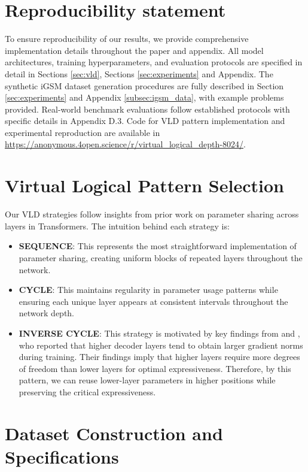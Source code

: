 \documentclass{article} %
\begin{document}
\section{ Reproducibility statement}
To ensure reproducibility of our results, we provide comprehensive implementation details throughout the paper and appendix. All model architectures, training hyperparameters, and evaluation protocols are specified in detail in Sections \ref{sec:vld}, Sections \ref{sec:experiments} and Appendix. The synthetic iGSM dataset generation procedures are fully described in Section \ref{sec:experiments} and Appendix \ref{subsec:igsm_data}, with example problems provided. Real-world benchmark evaluations follow established protocols with specific details in Appendix D.3. Code for VLD pattern implementation and experimental reproduction are available in \url{https://anonymous.4open.science/r/virtual_logical_depth-8024/}. 



\section{Virtual Logical Pattern Selection}
\label{sec:d}
Our VLD strategies follow insights from prior work on parameter sharing across layers in Transformers. The intuition behind each strategy is:

\begin{itemize}
    \item \textbf{SEQUENCE}: This represents the most straightforward implementation of parameter sharing, creating uniform blocks of repeated layers throughout the network.
    \item \textbf{CYCLE}: This maintains regularity in parameter usage patterns while ensuring each unique layer appears at consistent intervals throughout the network depth.
    \item \textbf{INVERSE CYCLE}: This strategy is motivated by key findings from \citep{liu2023enhancing} and \citep{takase2021lessons}, who reported that higher decoder layers tend to obtain larger gradient norms during training. Their findings imply that higher layers require more degrees of freedom than lower layers for optimal expressiveness. Therefore, by this pattern, we can reuse lower-layer parameters in higher positions while preserving the critical expressiveness.
\end{itemize}


\section{Dataset Construction and Specifications} \label{sec:dataset}
\end{document}

